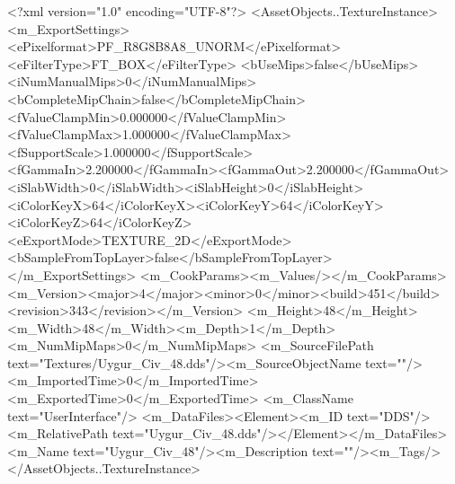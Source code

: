 <?xml version="1.0" encoding="UTF-8"?>
<AssetObjects..TextureInstance>
  <m_ExportSettings>
    <ePixelformat>PF_R8G8B8A8_UNORM</ePixelformat><eFilterType>FT_BOX</eFilterType>
    <bUseMips>false</bUseMips><iNumManualMips>0</iNumManualMips><bCompleteMipChain>false</bCompleteMipChain>
    <fValueClampMin>0.000000</fValueClampMin><fValueClampMax>1.000000</fValueClampMax><fSupportScale>1.000000</fSupportScale>
    <fGammaIn>2.200000</fGammaIn><fGammaOut>2.200000</fGammaOut><iSlabWidth>0</iSlabWidth><iSlabHeight>0</iSlabHeight>
    <iColorKeyX>64</iColorKeyX><iColorKeyY>64</iColorKeyY><iColorKeyZ>64</iColorKeyZ>
    <eExportMode>TEXTURE_2D</eExportMode><bSampleFromTopLayer>false</bSampleFromTopLayer>
  </m_ExportSettings>
  <m_CookParams><m_Values/></m_CookParams>
  <m_Version><major>4</major><minor>0</minor><build>451</build><revision>343</revision></m_Version>
  <m_Height>48</m_Height><m_Width>48</m_Width><m_Depth>1</m_Depth><m_NumMipMaps>0</m_NumMipMaps>
  <m_SourceFilePath text="Textures/Uygur_Civ_48.dds"/><m_SourceObjectName text=""/>
  <m_ImportedTime>0</m_ImportedTime><m_ExportedTime>0</m_ExportedTime>
  <m_ClassName text="UserInterface"/>
  <m_DataFiles><Element><m_ID text="DDS"/><m_RelativePath text="Uygur_Civ_48.dds"/></Element></m_DataFiles>
  <m_Name text="Uygur_Civ_48"/><m_Description text=""/><m_Tags/>
</AssetObjects..TextureInstance>
